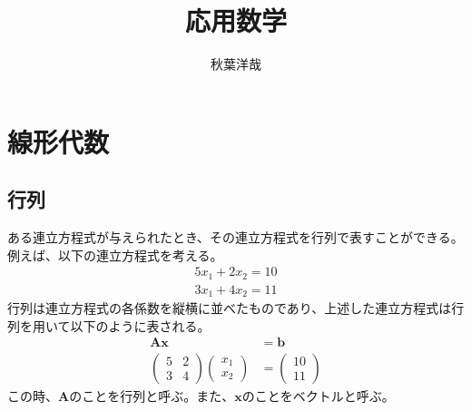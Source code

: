 \documentclass{ltjsarticle}
\begin{document}
\title{応用数学}
\author{秋葉洋哉}
\maketitle
\section{線形代数}
\subsection{行列}
ある連立方程式が与えられたとき、その連立方程式を行列で表すことができる。例えば、以下の連立方程式を考える。
\begin{align}
 5x_1 + 2x_2 = 10 \\
 3x_1 + 4x_2 = 11
\end{align}
行列は連立方程式の各係数を縦横に並べたものであり、上述した連立方程式は行列を用いて以下のように表される。
\begin{align}
\mathbf{A} \mathbf{x} &= \mathbf{b}\\
\begin{pmatrix}
  5 & 2 \\
  3 & 4
\end{pmatrix}
\begin{pmatrix}
  x_1 \\
  x_2
\end{pmatrix}
&=
\begin{pmatrix}
  10 \\
  11
\end{pmatrix}
\end{align}
この時、$\mathbf{A}$のことを行列と呼ぶ。また、$\mathbf{x}$のことをベクトルと呼ぶ。

\newpage
\end{document}
